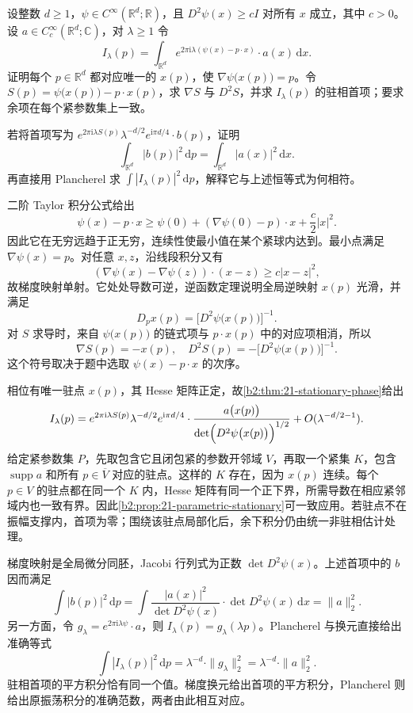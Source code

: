 \begin{exercise}\label{b2:ex:21-new-3}
设整数 \(d\geq1\)，\(\psi\in C^\infty(\mathbb R^d;\mathbb R)\)，且
\(D^2\psi(x)\geq cI\) 对所有 \(x\) 成立，其中 \(c>0\)。设 \(a\in C_c^\infty(\mathbb R^d;\mathbb C)\)，对 \(\lambda\geq1\) 令
\[
 I_\lambda(p)=\int_{\mathbb R^d}
   e^{2\pi\mathrm i\lambda(\psi(x)-p\cdot x)}\cdot a(x)\,\mathrm dx.
\]
证明每个 \(p\in\mathbb R^d\) 都对应唯一的 \(x(p)\)，使 \(\nabla\psi\bigl(x(p)\bigr)=p\)。令
\(S(p)=\psi\bigl(x(p)\bigr)-p\cdot x(p)\)，求 \(\nabla S\) 与 \(D^2S\)，并求 \(I_\lambda(p)\) 的驻相首项；要求余项在每个紧参数集上一致。

\ProseParagraphBreak

若将首项写为
\(e^{2\pi\mathrm i\lambda S(p)}\lambda^{-d/2}e^{\mathrm i\pi d/4}\cdot b(p)\)，证明
\[
 \int_{\mathbb R^d}|b(p)|^2\,\mathrm dp
       =\int_{\mathbb R^d}|a(x)|^2\,\mathrm dx.
\]
再直接用 Plancherel 求 \(\int|I_\lambda(p)|^2\,\mathrm dp\)，解释它与上述恒等式为何相符。
\end{exercise}
\begin{solution}
二阶 Taylor 积分公式给出
\[
 \psi(x)-p\cdot x
 \geq\psi(0)+(\nabla\psi(0)-p)\cdot x+\frac c2|x|^2.
\]
因此它在无穷远趋于正无穷，连续性使最小值在某个紧球内达到。最小点满足 \(\nabla\psi(x)=p\)。对任意 \(x,z\)，沿线段积分又有
\[
 (\nabla\psi(x)-\nabla\psi(z))\cdot(x-z)
       \geq c|x-z|^2,
\]
故梯度映射单射。它处处导数可逆，逆函数定理说明全局逆映射 \(x(p)\) 光滑，并满足
\[
 D_px(p)=\bigl[D^2\psi\bigl(x(p)\bigr)\bigr]^{-1}.
\]
对 \(S\) 求导时，来自 \(\psi\bigl(x(p)\bigr)\) 的链式项与 \(p\cdot x(p)\) 中的对应项相消，所以
\[
 \nabla S(p)=-x(p),
 \quad D^2S(p)=-\bigl[D^2\psi\bigl(x(p)\bigr)\bigr]^{-1}.
\]
这个符号取决于题中选取 \(\psi(x)-p\cdot x\) 的次序。

相位有唯一驻点 \(x(p)\)，其 Hesse 矩阵正定，故\cref{b2:thm:21-stationary-phase}给出
\[
 I_\lambda(p)=e^{2\pi\mathrm i\lambda S(p)}\lambda^{-d/2}
 e^{\mathrm i\pi d/4}\cdot
 \frac{a\bigl(x(p)\bigr)}{\det\Bigl(D^2\psi\bigl(x(p)\bigr)\Bigr)^{1/2}}
 +O(\lambda^{-d/2-1}).
\]
给定紧参数集 \(P\)，先取包含它且闭包紧的参数开邻域 \(V\)，再取一个紧集 \(K\)，包含 \(\operatorname{supp}a\) 和所有 \(p\in\overline V\) 对应的驻点。这样的 \(K\) 存在，因为 \(x(p)\) 连续。每个 \(p\in V\) 的驻点都在同一个 \(K\) 内，Hesse 矩阵有同一个正下界，所需导数在相应紧邻域内也一致有界。因此\cref{b2:prop:21-parametric-stationary}可一致应用。若驻点不在振幅支撑内，首项为零；围绕该驻点局部化后，余下积分仍由统一非驻相估计处理。

梯度映射是全局微分同胚，Jacobi 行列式为正数 \(\det D^2\psi(x)\)。上述首项中的 \(b\) 因而满足
\[
 \int|b(p)|^2\,\mathrm dp
 =\int\frac{|a(x)|^2}{\det D^2\psi(x)}
                    \cdot\det D^2\psi(x)\,\mathrm dx
 =\|a\|_2^2.
\]
另一方面，令 \(g_\lambda=e^{2\pi\mathrm i\lambda\psi}\cdot a\)，则
\(I_\lambda(p)=\widehat g_\lambda(\lambda p)\)。Plancherel 与换元直接给出准确等式
\[
 \int|I_\lambda(p)|^2\,\mathrm dp
       =\lambda^{-d}\cdot\|g_\lambda\|_2^2
       =\lambda^{-d}\cdot\|a\|_2^2.
\]
驻相首项的平方积分恰有同一个值。梯度换元给出首项的平方积分，Plancherel 则给出原振荡积分的准确范数，两者由此相互对应。
\end{solution}

